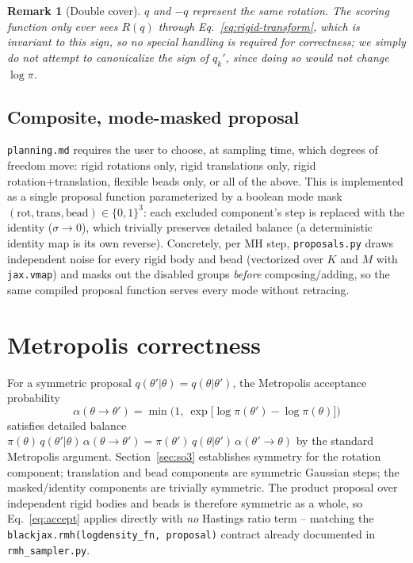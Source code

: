 \documentclass[11pt]{article}
\newtheorem{remark}{Remark}
\begin{document}
\begin{remark}[Double cover]
$q$ and $-q$ represent the same rotation. The scoring function only ever
sees $R(q)$ through Eq.~\eqref{eq:rigid-transform}, which is invariant to
this sign, so no special handling is required for correctness; we simply
do \emph{not} attempt to canonicalize the sign of $q_k'$, since doing so
would not change $\log\pi$.
\end{remark}

\subsection{Composite, mode-masked proposal}
\label{sec:modes}

\texttt{planning.md} requires the user to choose, at sampling time, which
degrees of freedom move: rigid rotations only, rigid translations only,
rigid rotation+translation, flexible beads only, or all of the above. This
is implemented as a single proposal function parameterized by a boolean
mode mask $(\text{rot}, \text{trans}, \text{bead}) \in \{0,1\}^3$: each
excluded component's step is replaced with the identity ($\sigma \to 0$),
which trivially preserves detailed balance (a deterministic identity map is
its own reverse). Concretely, per MH step, \texttt{proposals.py} draws
independent noise for every rigid body and bead (vectorized over $K$ and
$M$ with \texttt{jax.vmap}) and masks out the disabled groups \emph{before}
composing/adding, so the same compiled proposal function serves every mode
without retracing.

\section{Metropolis correctness}
\label{sec:mh}

For a symmetric proposal $q(\theta'|\theta) = q(\theta|\theta')$, the
Metropolis acceptance probability
\begin{equation}
  \label{eq:accept}
  \alpha(\theta \to \theta') = \min\Big(1,\ \exp\big[\log\pi(\theta') - \log\pi(\theta)\big]\Big)
\end{equation}
satisfies detailed balance $\pi(\theta)\,q(\theta'|\theta)\,\alpha(\theta\to\theta')
= \pi(\theta')\,q(\theta|\theta')\,\alpha(\theta'\to\theta)$ by the standard
Metropolis argument. Section~\ref{sec:so3} establishes symmetry for the
rotation component; translation and bead components are symmetric Gaussian
steps; the masked/identity components are trivially symmetric. The product
proposal over independent rigid bodies and beads is therefore symmetric as a
whole, so Eq.~\eqref{eq:accept} applies directly with \emph{no} Hastings
ratio term -- matching the \texttt{blackjax.rmh(logdensity\_fn, proposal)}
contract already documented in \texttt{rmh\_sampler.py}.
\end{document}
